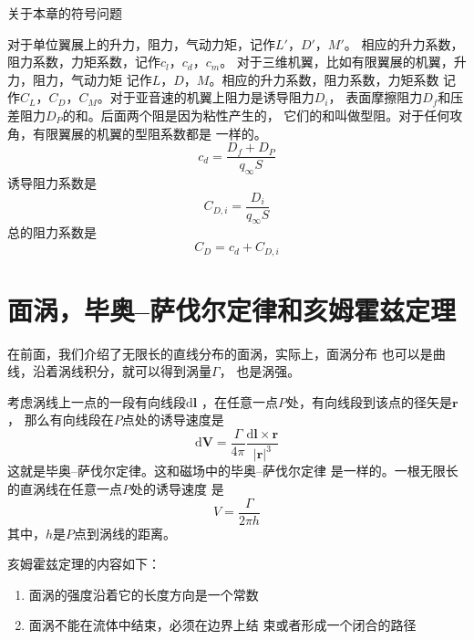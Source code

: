 \begin{notice}
关于本章的符号问题

对于单位翼展上的升力，阻力，气动力矩，记作$L'$，$D'$，$M'$。
相应的升力系数，阻力系数，力矩系数，记作$c_l$，$c_d$，$c_m$。
对于三维机翼，比如有限翼展的机翼，升力，阻力，气动力矩
记作$L$，$D$，$M$。相应的升力系数，阻力系数，力矩系数
记作$C_L$，$C_D$，$C_M$。对于亚音速的机翼上阻力是诱导阻力$D_i$，
表面摩擦阻力$D_f$和压差阻力$D_P$的和。后面两个阻是因为粘性产生的，
它们的和叫做型阻。对于任何攻角，有限翼展的机翼的型阻系数都是
一样的。
\[
 c_d=\frac{D_f+D_P}{q_\infty S} 
\]
诱导阻力系数是
\[
  C_{D,i}=\frac{D_i}{q_\infty S}
\]
总的阻力系数是
\[
  C_D=c_d+C_{D,i}
\]
\end{notice}

\section{面涡，毕奥--萨伐尔定律和亥姆霍兹定理}
在前面，我们介绍了无限长的直线分布的面涡，实际上，面涡分布
也可以是曲线，沿着涡线积分，就可以得到涡量$\Gamma$，
也是涡强。

考虑涡线上一点的一段有向线段$\mathrm{d}\mathbf{l}$
，在任意一点$P$处，有向线段到该点的径矢是$\mathbf{r}$，
那么有向线段在$P$点处的诱导速度是
\[
  \mathrm{d}\mathbf{V}=\frac{\Gamma}{4 \pi}
  \frac{\mathrm{d}\mathbf{l}\times \mathbf{r}}{\lvert \mathbf{r}\rvert ^3}
\]
这就是毕奥--萨伐尔定律。这和磁场中的毕奥--萨伐尔定律
是一样的。一根无限长的直涡线在任意一点$P$处的诱导速度
是
\[
  V=\frac{\Gamma}{2 \pi h }
\]
其中，$h$是$P$点到涡线的距离。

亥姆霍兹定理的内容如下：
\begin{enumerate}
  \item 面涡的强度沿着它的长度方向是一个常数
  \item 面涡不能在流体中结束，必须在边界上结
    束或者形成一个闭合的路径
\end{enumerate}

